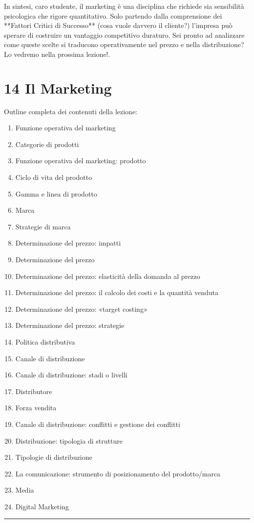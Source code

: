 \documentclass[a4paper,10pt]{article}
\begin{document}
In sintesi, caro studente, il marketing è una disciplina che richiede sia sensibilità psicologica che rigore quantitativo. Solo partendo dalla comprensione dei **Fattori Critici di Successo** (cosa vuole davvero il cliente?) l'impresa può sperare di costruire un vantaggio competitivo duraturo. Sei pronto ad analizzare come queste scelte si traducono operativamente nel prezzo e nella distribuzione? Lo vedremo nella prossima lezione!.

\section*{14 Il Marketing}

Outline completa dei contenuti della lezione:
{\small
\begin{enumerate}
\item Funzione operativa del marketing
\item Categorie di prodotti
\item Funzione operativa del marketing: prodotto
\item Ciclo di vita del prodotto
\item Gamma e linea di prodotto
\item Marca
\item Strategie di marca
\item Determinazione del prezzo: impatti
\item Determinazione del prezzo
\item Determinazione del prezzo: elasticità della domanda al prezzo
\item Determinazione del prezzo: il calcolo dei costi e la quantità venduta
\item Determinazione del prezzo: «target costing»
\item Determinazione del prezzo: strategie
\item Politica distributiva
\item Canale di distribuzione
\item Canale di distribuzione: stadi o livelli
\item Distributore
\item Forza vendita
\item Canale di distribuzione: conflitti e gestione dei conflitti
\item Distribuzione: tipologia di strutture
\item Tipologie di distribuzione
\item La comunicazione: strumento di posizionamento del prodotto/marca
\item Media
\item Digital Marketing
\end{enumerate}
}
\hrule
\vspace{0.5cm}
\end{document}
